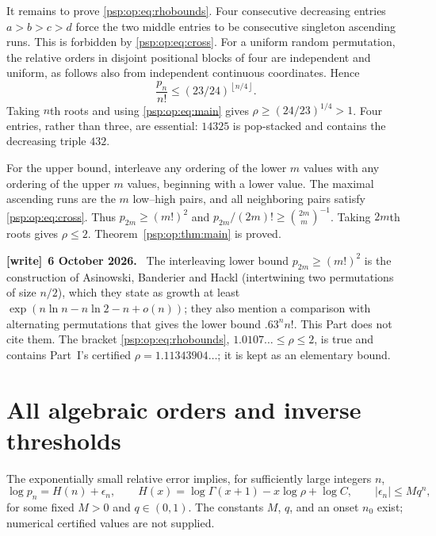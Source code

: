 \documentclass[11pt,letterpaper]{article}
\numberwithin{equation}{section}
\theoremstyle{remark}\newtheorem{remark}[theorem]{Remark}
\newcommand{\floor}[1]{\left\lfloor#1\right\rfloor}
\newenvironment{writenote}[1][]{\par\smallskip\begingroup\small
 \noindent\textbf{[write]}\if\relax\detokenize{#1}\relax\else~\textbf{#1.}\fi\ }%
 {\par\endgroup\smallskip}
\begin{document}
It remains to prove \eqref{psp:op:eq:rhobounds}. Four consecutive decreasing
entries $a>b>c>d$ force the two middle entries to be consecutive
singleton ascending runs. This is forbidden by \eqref{psp:op:eq:cross}.
For a uniform random permutation, the relative orders in disjoint
positional blocks of four are independent and uniform, as follows
also from independent continuous coordinates. Hence
\begin{equation}\label{psp:op:eq:four}
 \frac{p_n}{n!}\leq(23/24)^{\floor{n/4}}.
\end{equation}
Taking $n$th roots and using \eqref{psp:op:eq:main} gives
$\rho\geq(24/23)^{1/4}>1$. Four entries, rather than three, are
essential: $14325$ is pop-stacked and contains the decreasing triple
$432$.

For the upper bound, interleave any ordering of the lower $m$ values
with any ordering of the upper $m$ values, beginning with a lower
value. The maximal ascending runs are the $m$ low--high pairs, and
all neighboring pairs satisfy \eqref{psp:op:eq:cross}. Thus
$p_{2m}\geq(m!)^2$ and
$p_{2m}/(2m)!\geq\binom{2m}{m}^{-1}$. Taking $2m$th roots gives
$\rho\leq2$. Theorem~\ref{psp:op:thm:main} is proved.
\begin{writenote}[6 October 2026]
The interleaving lower bound $p_{2m}\ge(m!)^2$ is the construction of Asinowski, Banderier and Hackl \cite[Theorem~12, Section~2.4]{abh} (intertwining two permutations of size $n/2$), which they state as growth at least $\exp(n\ln n-n\ln2-n+o(n))$; they also mention a comparison with alternating permutations that gives the lower bound $.63^nn!$. This Part does not cite them. The bracket \eqref{psp:op:eq:rhobounds}, $1.0107\ldots\le\rho\le2$, is true and contains Part~I's certified $\rho=1.11343904\ldots$; it is kept as an elementary bound.
\end{writenote}

\section{All algebraic orders and inverse thresholds}\label{psp:op:sec:inverse}
The exponentially small relative error implies, for sufficiently
large integers $n$,
\begin{equation}\label{psp:op:eq:loggamma}
 \log p_n=H(n)+\epsilon_n,\qquad
 H(x)=\log\Gamma(x+1)-x\log\rho+\log C,
 \qquad |\epsilon_n|\leq Mq^n,
\end{equation}
for some fixed $M>0$ and $q\in(0,1)$. The constants $M$, $q$, and
an onset $n_0$ exist; numerical certified values are not supplied.
\end{document}
